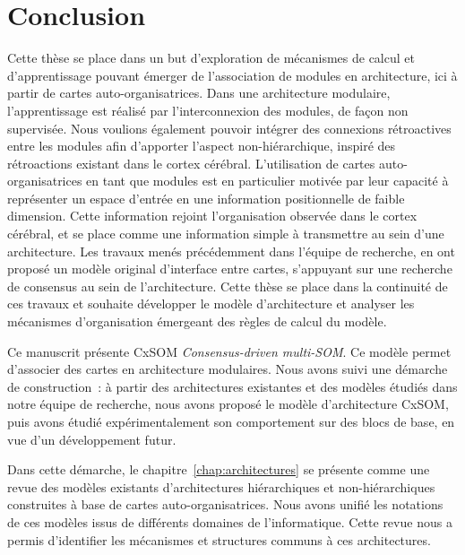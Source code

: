 \chapter*{Conclusion}

Cette thèse se place dans un but d'exploration de mécanismes de calcul et d'apprentissage pouvant émerger de l'association de modules en architecture, ici à partir de cartes auto-organisatrices.
Dans une architecture modulaire, l'apprentissage est réalisé par l'interconnexion des modules, de façon non supervisée. Nous voulions également pouvoir intégrer des connexions rétroactives entre les modules afin d'apporter l'aspect non-hiérarchique, inspiré des rétroactions existant dans le cortex cérébral.
L'utilisation de cartes auto-organisatrices en tant que modules est en particulier motivée par leur capacité à représenter un espace d'entrée en une information positionnelle de faible dimension. Cette information rejoint l'organisation observée dans le cortex cérébral, et se place comme une information simple à transmettre au sein d'une architecture.
Les travaux menés précédemment dans l'équipe de recherche, en \cite{menard05,khouzam_2013,baheux_towards_2014} ont proposé un modèle original d'interface entre cartes, s'appuyant sur une recherche de consensus au sein de l'architecture. Cette thèse se place dans la continuité de ces travaux et souhaite développer le modèle d'architecture et analyser les mécanismes d'organisation émergeant des règles de calcul du modèle. 


Ce manuscrit présente CxSOM \emph{Consensus-driven multi-SOM}. Ce modèle permet d'associer des cartes en architecture modulaires.
Nous avons suivi une démarche de construction~: à partir des architectures existantes et des modèles étudiés dans notre équipe de recherche, nous avons proposé le modèle d'architecture CxSOM, puis avons étudié expérimentalement son comportement sur des blocs de base, en vue d'un développement futur.

Dans cette démarche, le chapitre~\ref{chap:architectures} se présente comme une revue des modèles existants d'architectures hiérarchiques et non-hiérarchiques construites à base de cartes auto-organisatrices. 
Nous avons unifié les notations de ces modèles issus de différents domaines de l'informatique. Cette revue nous a permis d'identifier les mécanismes et structures communs à ces architectures.



